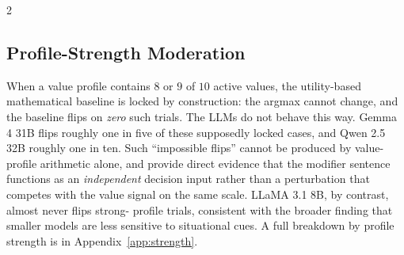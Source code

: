 \documentclass[11pt]{article}
\begin{document}
\begin{multicols}{2}

\subsection{Profile-Strength Moderation}

When a value profile contains $8$ or $9$ of $10$ active values, the
utility-based mathematical baseline is locked by construction: the
argmax cannot change, and the baseline flips on \emph{zero} such
trials. The LLMs do not behave this way. Gemma 4 31B flips roughly
one in five of these supposedly locked cases, and Qwen 2.5 32B
roughly one in ten. Such ``impossible flips'' cannot be produced by
value-profile arithmetic alone, and provide direct evidence that the
modifier sentence functions as an \emph{independent} decision input
rather than a perturbation that competes with the value signal on the
same scale. LLaMA 3.1 8B, by contrast, almost never flips strong-
profile trials, consistent with the broader finding that smaller
models are less sensitive to situational cues. A full breakdown by
profile strength is in Appendix~\ref{app:strength}.

\end{multicols}
\end{document}
